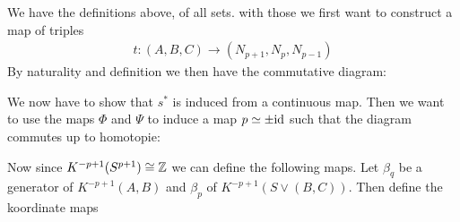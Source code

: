 \begin{cor}
	We have the definitions above, of all sets. with those we first want to construct a map of triples
	\begin{align*}
		t:(A,B,C)\to (N_{p+1},N_p,N_{p-1})
	\end{align*} By naturality and definition we then have the commutative diagram: 
	\begin{center}
	\end{center}
	We now have to show that $s^*$ is induced from a continuous map. Then we want to use the maps $\Phi$ and $\Psi$ to induce a map $p\simeq \pm \text{id} $ such that the diagram commutes up to homotopie:
	\begin{center}
	\end{center}
	Now since  $K^{-p+1}(S^{p+1})\cong \mathbb{Z}$ we can define the following maps. Let $\beta_q$ be a generator of $K^{-p+1}(A,B)$ and $\beta_p$ of $K^{-p+1}(S\vee (B,C))$. Then define the koordinate maps 

\end{cor}
